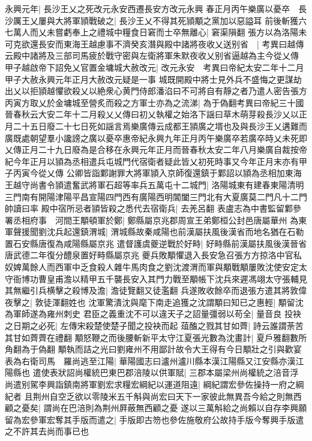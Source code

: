永興元年|{
	長沙王乂之死改元永安西遷長安方改元永興}
春正月丙午樂廣以憂卒　長沙厲王乂屢與大將軍頴戰破之|{
	長沙王乂不得其死頴顒之黨加以惡謚耳}
前後斬獲六七萬人而乂未嘗虧奉上之禮城中糧食日窘而士卒無離心|{
	窘渠隕翻}
張方以為洛陽未可克欲還長安而東海王越慮事不濟癸亥潛與殿中諸將夜收乂送别省　|{
	考異曰越傳云殿中諸將及三部司馬疲於戰守密與左衛將軍朱默夜收乂别省逼越為主今從乂傳}
甲子越啟帝下詔免乂官置金墉城大赦改元|{
	改元永安　考異曰帝紀太安二年十二月甲子大赦永興元年正月大赦改元疑是一事}
城既開殿中將士見外兵不盛悔之更謀劫出乂以拒頴越懼欲殺乂以絶衆心黄門侍郎潘淊曰不可將自有靜之者乃遣人密告張方丙寅方取乂於金墉城至營炙而殺之方軍士亦為之流涕|{
	為于偽翻考異曰帝紀三十國晉春秋云大安二年十二月殺乂乂傳曰初乂執權之始洛下謡曰草木萌芽殺長沙乂以正月二十五日廢二十七日死如謡言焉樂廣傳云成都王頴廣之壻也及與長沙王乂遘難而廣既處朝望羣小讒謗之廣以憂卒惠帝紀永興九年正月丙午樂廣卒若廣卒時乂未死即乂傳正月二十九日廢為是合移在永興元年正月而晉春秋太安二年八月樂廣自裁按帝紀今年正月以頴為丞相遣兵屯城門代宿衛者疑此皆乂初死時事又今年正月末亦有甲子丙寅今從乂傳}
公卿皆詣鄴謝罪大將軍頴入京師復還鎮于鄴詔以頴為丞相加東海王越守尚書令頴遣奮武將軍石超等率兵五萬屯十二城門|{
	洛陽城東有建春東陽清明三門南有開陽津陽平昌宣陽四門西有廣陽西明閶闔三門北有大夏廣莫二門凡十二門帥讀曰率}
殿中宿所忌者頴皆殺之悉代去宿衛兵|{
	去羌呂翻}
表盧志為中書監留鄴參署丞相府事　河間王顒頓軍於鄭|{
	鄭縣屬京兆郡周宣王弟鄭桓公封邑唐屬華州}
為東軍聲援聞劉沈兵起還鎮渭城|{
	渭城縣故秦咸陽也前漢屬扶風後漢省而地名猶在石勒置石安縣唐復為咸陽縣屬京兆}
遣督護虞夔逆戰於好畤|{
	好畤縣前漢屬扶風後漢晉省唐武德二年復分醴泉置好畤縣屬京兆}
夔兵敗顒懼退入長安急召張方方掠洛中官私奴婢萬餘人而西軍中乏食殺人雜牛馬肉食之劉沈渡渭而軍與顒戰顒屢敗沈使安定太守衙博功曹皇甫澹以精甲五千襲長安入其門力戰至顒帳下沈兵來遲馮翊太守張輔見其無繼引兵横擊之殺博及澹|{
	澹徒覽翻又徒濫翻}
兵遂敗收餘卒而退張方遣其將敦偉夜擊之|{
	敦徒渾翻姓也}
沈軍驚潰沈與麾下南走追獲之沈謂顒曰知已之惠輕|{
	顒留沈為軍師遂為雍州刺史}
君臣之義重沈不可以違天子之詔量彊弱以苟全|{
	量音良}
投袂之日期之必死|{
	左傳宋殺楚使楚子聞之投袂而起}
葅醢之戮其甘如薺|{
	詩云誰謂荼苦其甘如薺薺在禮翻}
顒怒鞭之而後腰斬新平太守江夏張光數為沈畫計|{
	夏戶雅翻數所角翻為于偽翻}
顒執而詰之光曰劉雍州不用鄙計故令大王得有今日顒壯之引與歡宴表為右衛司馬　羅尚逃至江陽|{
	華陽國志曰瀘州瀘川縣本漢江陽縣又江安縣亦漢江陽縣也}
遣使表狀詔尚權統巴東巴郡涪陵以供軍賦|{
	三郡本屬梁州尚權統之涪音浮}
尚遣别駕李興詣鎮南將軍劉宏求糧宏綱紀以運道阻遠|{
	綱紀謂宏參佐操持一府之綱紀者}
且荆州自空乏欲以零陵米五千斛與尚宏曰天下一家彼此無異吾今給之則無西顧之憂矣|{
	謂尚在巴涪則為荆州屛蔽無西顧之憂}
遂以三萬斛給之尚賴以自存李興願留為宏參軍宏奪其手版而遣之|{
	手版即古笏也參佐施敬府公故持手版今奪興手版遣之不許其去尚而事已也}
